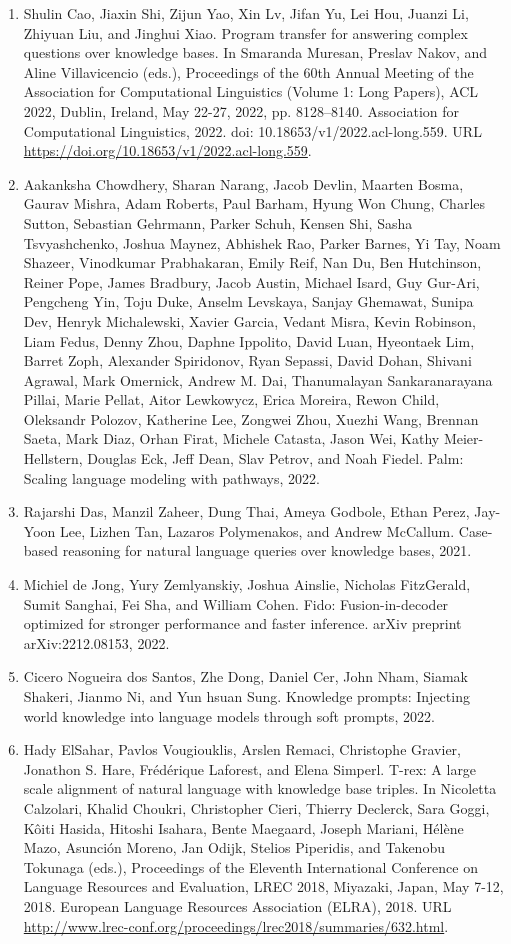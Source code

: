 \documentclass[11pt,UTF8,fontset=fandol]{ctexart}
\begin{document}
\begin{enumerate}[leftmargin=2em]
\item Shulin Cao, Jiaxin Shi, Zijun Yao, Xin Lv, Jifan Yu, Lei Hou, Juanzi Li, Zhiyuan Liu, and Jinghui Xiao. Program transfer for answering complex questions over knowledge bases. In Smaranda Muresan, Preslav Nakov, and Aline Villavicencio (eds.), Proceedings of the 60th Annual Meeting of the Association for Computational Linguistics (Volume 1: Long Papers), ACL 2022, Dublin, Ireland, May 22-27, 2022, pp. 8128--8140. Association for Computational Linguistics, 2022. doi: 10.18653/v1/2022.acl-long.559. URL \url{https://doi.org/10.18653/v1/2022.acl-long.559}.
\item Aakanksha Chowdhery, Sharan Narang, Jacob Devlin, Maarten Bosma, Gaurav Mishra, Adam Roberts, Paul Barham, Hyung Won Chung, Charles Sutton, Sebastian Gehrmann, Parker Schuh, Kensen Shi, Sasha Tsvyashchenko, Joshua Maynez, Abhishek Rao, Parker Barnes, Yi Tay, Noam Shazeer, Vinodkumar Prabhakaran, Emily Reif, Nan Du, Ben Hutchinson, Reiner Pope, James Bradbury, Jacob Austin, Michael Isard, Guy Gur-Ari, Pengcheng Yin, Toju Duke, Anselm Levskaya, Sanjay Ghemawat, Sunipa Dev, Henryk Michalewski, Xavier Garcia, Vedant Misra, Kevin Robinson, Liam Fedus, Denny Zhou, Daphne Ippolito, David Luan, Hyeontaek Lim, Barret Zoph, Alexander Spiridonov, Ryan Sepassi, David Dohan, Shivani Agrawal, Mark Omernick, Andrew M. Dai, Thanumalayan Sankaranarayana Pillai, Marie Pellat, Aitor Lewkowycz, Erica Moreira, Rewon Child, Oleksandr Polozov, Katherine Lee, Zongwei Zhou, Xuezhi Wang, Brennan Saeta, Mark Diaz, Orhan Firat, Michele Catasta, Jason Wei, Kathy Meier-Hellstern, Douglas Eck, Jeff Dean, Slav Petrov, and Noah Fiedel. Palm: Scaling language modeling with pathways, 2022.
\item Rajarshi Das, Manzil Zaheer, Dung Thai, Ameya Godbole, Ethan Perez, Jay-Yoon Lee, Lizhen Tan, Lazaros Polymenakos, and Andrew McCallum. Case-based reasoning for natural language queries over knowledge bases, 2021.
\item Michiel de Jong, Yury Zemlyanskiy, Joshua Ainslie, Nicholas FitzGerald, Sumit Sanghai, Fei Sha, and William Cohen. Fido: Fusion-in-decoder optimized for stronger performance and faster inference. arXiv preprint arXiv:2212.08153, 2022.
\item Cicero Nogueira dos Santos, Zhe Dong, Daniel Cer, John Nham, Siamak Shakeri, Jianmo Ni, and Yun hsuan Sung. Knowledge prompts: Injecting world knowledge into language models through soft prompts, 2022.
\item Hady ElSahar, Pavlos Vougiouklis, Arslen Remaci, Christophe Gravier, Jonathon S. Hare, Fr\'{e}d\'{e}rique Laforest, and Elena Simperl. T-rex: A large scale alignment of natural language with knowledge base triples. In Nicoletta Calzolari, Khalid Choukri, Christopher Cieri, Thierry Declerck, Sara Goggi, K\^{o}iti Hasida, Hitoshi Isahara, Bente Maegaard, Joseph Mariani, H\'{e}l\`{e}ne Mazo, Asunci\'{o}n Moreno, Jan Odijk, Stelios Piperidis, and Takenobu Tokunaga (eds.), Proceedings of the Eleventh International Conference on Language Resources and Evaluation, LREC 2018, Miyazaki, Japan, May 7-12, 2018. European Language Resources Association (ELRA), 2018. URL \url{http://www.lrec-conf.org/proceedings/lrec2018/summaries/632.html}.

\end{enumerate}
\end{document}
